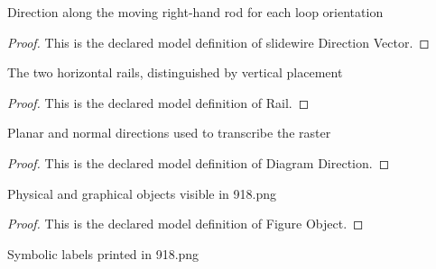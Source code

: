 \begin{definition}
  \label{def:physics:phyx-mini-0918:phyxminiproblems-problemphyxmini0918-slidewiredirectionvector}
  Direction along the moving right-hand rod for each loop orientation
\end{definition}
\begin{proof}
  This is the declared model definition of slidewire Direction Vector.
\end{proof}
\begin{definition}[Rail]
  \label{def:physics:phyx-mini-0918:phyxminiproblems-problemphyxmini0918-rail}
  The two horizontal rails, distinguished by vertical placement
\end{definition}
\begin{proof}
  This is the declared model definition of Rail.
\end{proof}
\begin{definition}
  \label{def:physics:phyx-mini-0918:phyxminiproblems-problemphyxmini0918-diagramdirection}
  Planar and normal directions used to transcribe the raster
\end{definition}
\begin{proof}
  This is the declared model definition of Diagram Direction.
\end{proof}
\begin{definition}
  \label{def:physics:phyx-mini-0918:phyxminiproblems-problemphyxmini0918-figureobject}
  Physical and graphical objects visible in 918.png
\end{definition}
\begin{proof}
  This is the declared model definition of Figure Object.
\end{proof}
\begin{definition}
  \label{def:physics:phyx-mini-0918:phyxminiproblems-problemphyxmini0918-figurelabel}
  Symbolic labels printed in 918.png
\end{definition}

